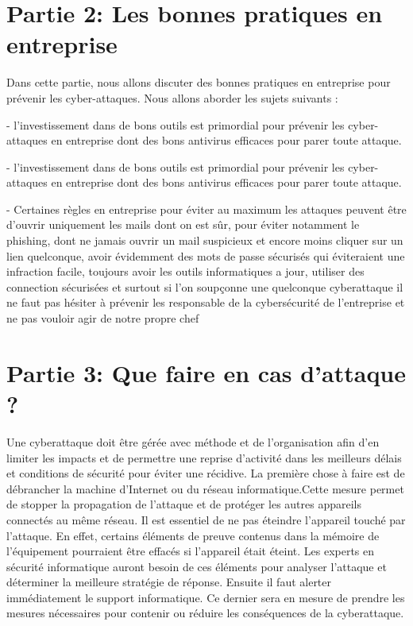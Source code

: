 \documentclass[a4paper,11pt]{article}
\begin{document}

\section{Partie 2: Les bonnes pratiques en entreprise}

Dans cette partie, nous allons discuter des bonnes pratiques en entreprise pour prévenir les cyber-attaques. Nous allons aborder les sujets suivants :

  - l’investissement dans de bons outils est primordial pour prévenir les cyber-attaques en entreprise dont des bons antivirus efficaces pour parer toute attaque.

  - l’investissement dans de bons outils est primordial pour prévenir les cyber-attaques en entreprise dont des bons antivirus efficaces pour parer toute attaque.

  - Certaines règles en entreprise pour éviter au maximum les attaques peuvent être d’ouvrir uniquement les mails dont on est sûr, pour éviter notamment le phishing, dont ne jamais ouvrir un mail suspicieux et encore moins cliquer sur un lien quelconque, avoir évidemment des mots de passe sécurisés qui éviteraient une infraction facile, toujours avoir les outils informatiques a jour, utiliser des connection sécurisées et surtout si l’on soupçonne une quelconque cyberattaque il ne faut pas hésiter à prévenir les responsable de la cybersécurité de l’entreprise et ne pas vouloir agir de notre propre chef


\section{Partie 3: Que faire en cas d’attaque ?}

Une cyberattaque doit être gérée avec méthode et de l’organisation afin d’en limiter les impacts et de permettre une reprise d’activité dans les meilleurs délais et conditions de sécurité pour éviter une récidive.
La première chose à faire est de débrancher la machine d’Internet ou du réseau informatique.Cette mesure permet de stopper la propagation de l’attaque et de protéger les autres appareils connectés au même réseau.
Il est essentiel de ne pas éteindre l’appareil touché par l’attaque. En effet, certains éléments de preuve contenus dans la mémoire de l’équipement pourraient être effacés si l’appareil était éteint. Les experts en sécurité informatique auront besoin de ces éléments pour analyser l’attaque et déterminer la meilleure stratégie de réponse.
Ensuite il faut alerter immédiatement le support informatique. Ce dernier sera en mesure de prendre les mesures nécessaires pour contenir ou réduire les conséquences de la cyberattaque.
\end{document}
